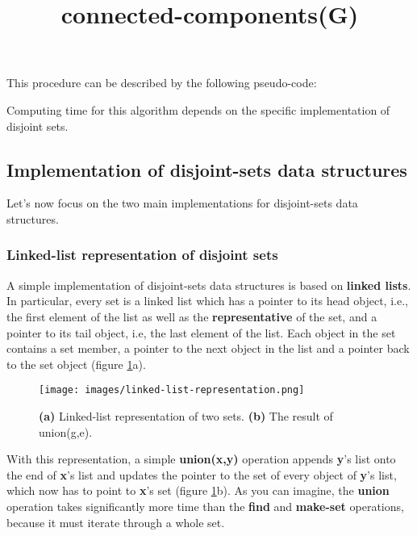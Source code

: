 \documentclass[11pt]{article}
\begin{document}
    This procedure can be described by the following pseudo-code:
    \begin{algorithm}[H]
        \SetAlgoLined
        \title{connected-components(G)}
        \label{algo:connected-components}
    \end{algorithm}
    Computing time for this algorithm depends on the specific implementation of disjoint sets.


    \subsection{Implementation of disjoint-sets data structures}
    Let's now focus on the two main implementations for disjoint-sets data structures.
    \subsubsection{Linked-list representation of disjoint sets}
    A simple implementation of disjoint-sets data structures is based on \textbf{linked lists}. In particular, every set is a linked list which has a pointer to its head object, i.e., the first element of the list as well as the \textbf{representative} of the set, and a pointer to its tail object, i.e, the last element of the list. Each object in the set contains a set member, a pointer to the next object in the list and a pointer back to the set object (figure \ref{fig:linked-list-representation}a).

    \begin{figure}[H]
        \centering
        \texttt{[image: images/linked-list-representation.png]}
        \caption{\textbf{(a)} Linked-list representation of two sets. \textbf{(b)} The result of union(g,e).}
        \label{fig:linked-list-representation}
    \end{figure}

    With this representation, a simple \textbf{union(x,y)} operation appends \textbf{y}'s list onto the end of \textbf{x}'s list and updates the pointer to the set of every object of \textbf{y}'s list, which now has to point to \textbf{x}'s set (figure \ref{fig:linked-list-representation}b). As you can imagine, the \textbf{union} operation takes significantly more time than the \textbf{find} and \textbf{make-set} operations, because it must iterate through a whole set.
\end{document}
